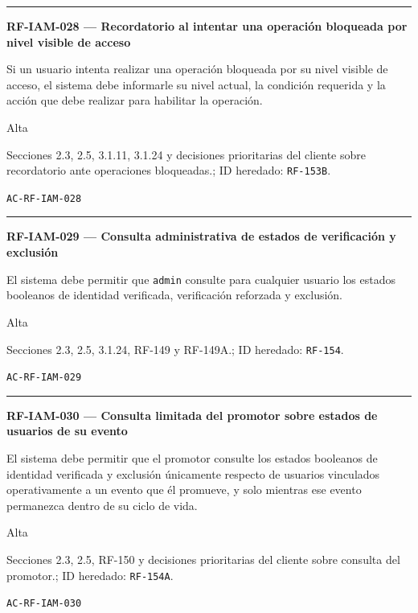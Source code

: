 \documentclass[10pt,letterpaper]{article}
\begin{document}
\vspace{0.25em}\hrule\vspace{0.65em}
\noindent\textbf{RF-IAM-028 --- Recordatorio al intentar una operación bloqueada por nivel visible de acceso}\par
\begin{description}[style=nextline,leftmargin=3.15cm,labelwidth=2.8cm,font=\normalfont\bfseries]
\item[Obligación] Si un usuario intenta realizar una operación bloqueada por su nivel visible de acceso, el sistema debe informarle su nivel actual, la condición requerida y la acción que debe realizar para habilitar la operación.
\item[Prioridad] Alta
\item[Procedencia] Secciones 2.3, 2.5, 3.1.11, 3.1.24 y decisiones prioritarias del cliente sobre recordatorio ante operaciones bloqueadas.; ID heredado: \texttt{RF-153B}.
\item[Verificación] \texttt{AC-RF-IAM-028}
\end{description}
\vspace{0.25em}\hrule\vspace{0.65em}
\noindent\textbf{RF-IAM-029 --- Consulta administrativa de estados de verificación y exclusión}\par
\begin{description}[style=nextline,leftmargin=3.15cm,labelwidth=2.8cm,font=\normalfont\bfseries]
\item[Obligación] El sistema debe permitir que \texttt{admin} consulte para cualquier usuario los estados booleanos de identidad verificada, verificación reforzada y exclusión.
\item[Prioridad] Alta
\item[Procedencia] Secciones 2.3, 2.5, 3.1.24, RF-149 y RF-149A.; ID heredado: \texttt{RF-154}.
\item[Verificación] \texttt{AC-RF-IAM-029}
\end{description}
\vspace{0.25em}\hrule\vspace{0.65em}
\noindent\textbf{RF-IAM-030 --- Consulta limitada del promotor sobre estados de usuarios de su evento}\par
\begin{description}[style=nextline,leftmargin=3.15cm,labelwidth=2.8cm,font=\normalfont\bfseries]
\item[Obligación] El sistema debe permitir que el promotor consulte los estados booleanos de identidad verificada y exclusión únicamente respecto de usuarios vinculados operativamente a un evento que él promueve, y solo mientras ese evento permanezca dentro de su ciclo de vida.
\item[Prioridad] Alta
\item[Procedencia] Secciones 2.3, 2.5, RF-150 y decisiones prioritarias del cliente sobre consulta del promotor.; ID heredado: \texttt{RF-154A}.
\item[Verificación] \texttt{AC-RF-IAM-030}
\end{description}
\end{document}
